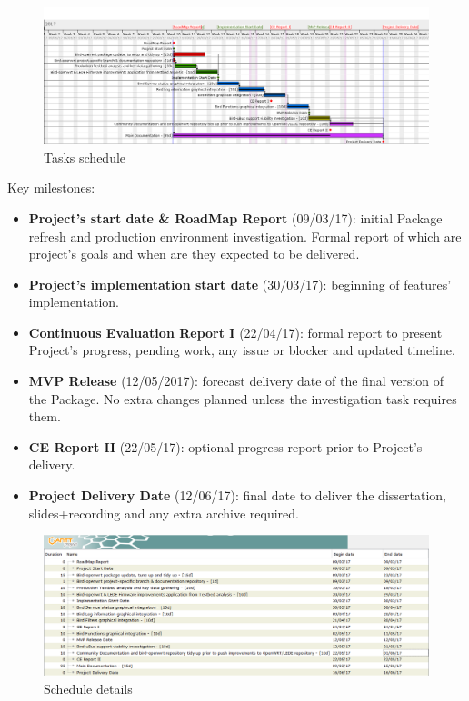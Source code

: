 \begin{landscape}

\begin{figure}[h!]
\centering
    \includegraphics[width=\hsize]{images/gantt}
    \caption{Tasks schedule}
    \label{fig:general_gantt}
\end{figure}

Key milestones:
\begin{itemize}
    \item \textbf{Project's start date \& RoadMap Report} (09/03/17): initial Package refresh and production environment investigation. Formal report of which are project's goals and when are they expected to be delivered.
    \item \textbf{Project's implementation start date} (30/03/17): beginning of features' implementation.
    \item \textbf{Continuous Evaluation Report I} (22/04/17): formal report to present Project's progress, pending work, any issue or blocker and updated  timeline.
    \item \textbf{MVP Release} (12/05/2017): forecast delivery date of the final version of the Package. No extra changes planned unless the investigation task requires them.
    \item \textbf{CE Report II} (22/05/17): optional progress report prior to Project's delivery.
    \item \textbf{Project Delivery Date} (12/06/17): final date to deliver the dissertation, slides+recording and any extra archive required.
\end{itemize} 

\begin{figure}[h!]
    \includegraphics[width=\hsize]{images/gantt_data}
    \caption{Schedule details}
    \label{fig:detail_gantt}
\end{figure}
\end{landscape}



